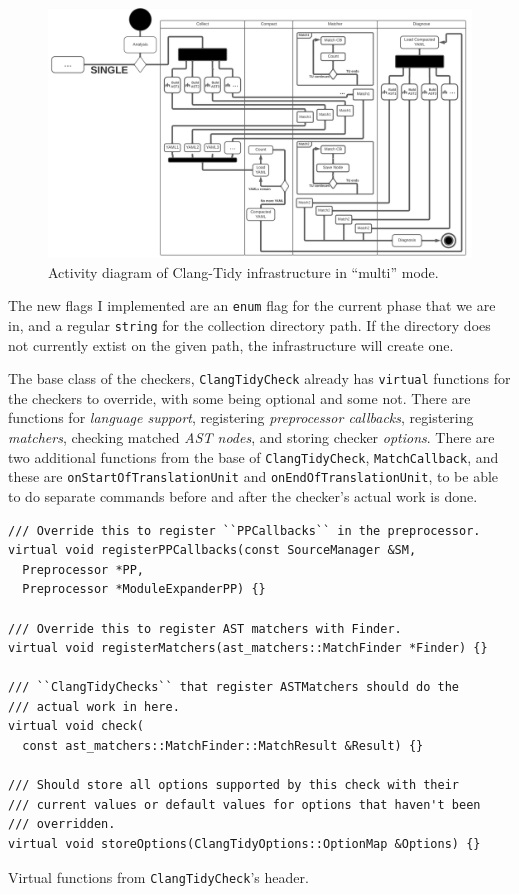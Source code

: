 \begin{figure}[H]
	\includegraphics[width=\linewidth]{images/activity_multi.png}
	\caption{Activity diagram of Clang-Tidy infrastructure in ``multi'' mode.}
	\label{fig:activity-multi}
\end{figure}

The new flags I implemented are an \texttt{enum} flag for the current phase that we are in, and a regular \texttt{string}
for the collection directory path. If the directory does not currently extist on the given path, the infrastructure will create one.

The base class of the checkers, \texttt{ClangTidyCheck} already has \texttt{virtual} functions for the checkers to override, with some
being optional and some not.
There are functions for \emph{language support}, registering \emph{preprocessor callbacks}, registering
\emph{matchers}, checking matched \emph{AST nodes}, and storing checker \emph{options}.
There are two additional functions from the base of
\texttt{ClangTidyCheck}, \texttt{MatchCallback}, and these are \texttt{onStartOfTranslationUnit} and \texttt{onEndOfTranslationUnit}, to
be able to do separate commands before and after the checker's actual work is done.

\begin{listing}[H]
  \begin{verbatim}
/// Override this to register ``PPCallbacks`` in the preprocessor.
virtual void registerPPCallbacks(const SourceManager &SM,
  Preprocessor *PP,
  Preprocessor *ModuleExpanderPP) {}

/// Override this to register AST matchers with Finder.
virtual void registerMatchers(ast_matchers::MatchFinder *Finder) {}

/// ``ClangTidyChecks`` that register ASTMatchers should do the
/// actual work in here.
virtual void check(
  const ast_matchers::MatchFinder::MatchResult &Result) {}

/// Should store all options supported by this check with their
/// current values or default values for options that haven't been
/// overridden.
virtual void storeOptions(ClangTidyOptions::OptionMap &Options) {}
\end{verbatim}
\caption{Virtual functions from \texttt{ClangTidyCheck}'s header.}\label{lst:ctc-single-virtual}
\end{listing}

